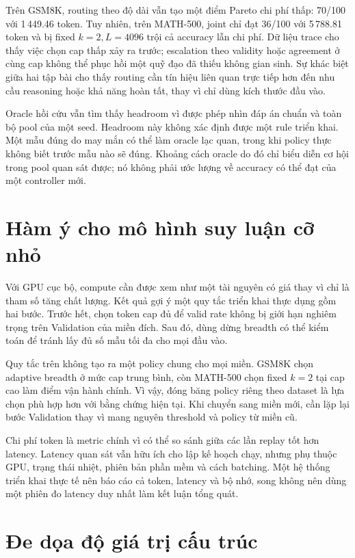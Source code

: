 Trên GSM8K, routing theo độ dài vẫn tạo một điểm Pareto chi phí thấp: 70/100
với 1\,449.46 token. Tuy nhiên, trên MATH-500, joint chỉ đạt 36/100 với
5\,788.81 token và bị fixed $k=2,L=4096$ trội cả accuracy lẫn chi phí. Dữ liệu
trace cho thấy việc chọn cap thấp xảy ra trước; escalation theo validity hoặc
agreement ở cùng cap không thể phục hồi một quỹ đạo đã thiếu không gian sinh.
Sự khác biệt giữa hai tập bài cho thấy routing cần tín hiệu liên quan trực tiếp
hơn đến nhu cầu reasoning hoặc khả năng hoàn tất, thay vì chỉ dùng kích thước
đầu vào.

Oracle hồi cứu vẫn tìm thấy headroom vì được phép nhìn đáp án chuẩn và toàn bộ
pool của một seed. Headroom này không xác định được một rule triển khai. Một
mẫu đúng do may mắn có thể làm oracle lạc quan, trong khi policy thực không
biết trước mẫu nào sẽ đúng. Khoảng cách oracle do đó chỉ biểu diễn cơ hội trong
pool quan sát được; nó không phải ước lượng về accuracy có thể đạt của một
controller mới.

\section{Hàm ý cho mô hình suy luận cỡ nhỏ}

Với GPU cục bộ, compute cần được xem như một tài nguyên có giá thay vì chỉ là
tham số tăng chất lượng. Kết quả gợi ý một quy tắc triển khai thực dụng gồm hai
bước. Trước hết, chọn token cap đủ để valid rate không bị giới hạn nghiêm trọng
trên Validation của miền đích. Sau đó, dùng dừng breadth có thể kiểm toán để
tránh lấy đủ số mẫu tối đa cho mọi đầu vào.

Quy tắc trên không tạo ra một policy chung cho mọi miền. GSM8K chọn adaptive
breadth ở mức cap trung bình, còn MATH-500 chọn fixed $k=2$ tại cap cao làm
điểm vận hành chính. Vì vậy, đóng băng policy riêng theo dataset là lựa chọn
phù hợp hơn với bằng chứng hiện tại. Khi chuyển sang miền mới, cần lặp lại bước
Validation thay vì mang nguyên threshold và policy từ miền cũ.

Chi phí token là metric chính vì có thể so sánh giữa các lần replay tốt hơn
latency. Latency quan sát vẫn hữu ích cho lập kế hoạch chạy, nhưng phụ thuộc
GPU, trạng thái nhiệt, phiên bản phần mềm và cách batching. Một hệ thống triển
khai thực tế nên báo cáo cả token, latency và bộ nhớ, song không nên dùng một
phiên đo latency duy nhất làm kết luận tổng quát.

\section{Đe dọa độ giá trị cấu trúc}


